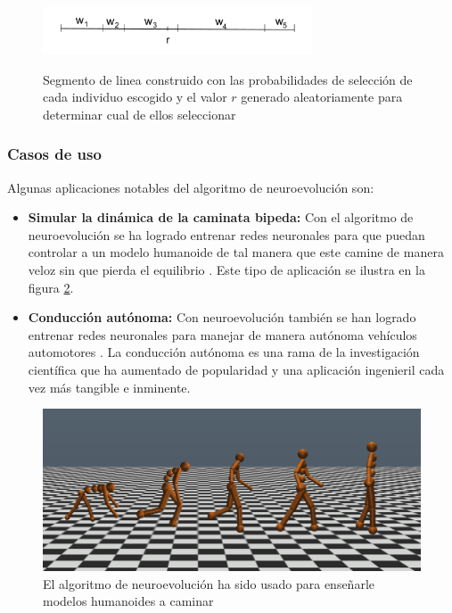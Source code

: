 \documentclass[twocolumn,spanish]{revtex4-1}
\begin{document}
\begin{figure}[ht]
\centering
\includegraphics[width=8cm]{ruleta.png}
\begin{quote}
\caption{Segmento de linea construido con las probabilidades de selección de cada individuo escogido y el valor $r$ generado aleatoriamente para determinar cual de ellos seleccionar \protect\cite{lipowski2012roulette}}
\label{fig:roulette}
\end{quote}
\end{figure}

\subsubsection{Casos de uso}
Algunas aplicaciones notables del algoritmo de neuroevolución son:

\begin{itemize}
    \item \textbf{Simular la dinámica de la caminata bipeda:} Con el algoritmo de neuroevolución se ha logrado entrenar redes neuronales para que puedan controlar a un modelo humanoide de tal manera que este camine de manera veloz sin que pierda el equilibrio \cite{jackson2019neuroevolution}. Este tipo de aplicación se ilustra en la figura \ref{fig:bipedo}.
    \item \textbf{Conducción autónoma:} Con neuroevolución también se han logrado entrenar redes neuronales para manejar de manera autónoma vehículos automotores \cite{sainathapplication}. La conducción autónoma es una rama de la investigación científica que ha aumentado de popularidad y una aplicación ingenieril cada vez más tangible e inminente.
\end{itemize}

\begin{figure}[h]
    \centering
    \includegraphics[width=0.9\linewidth]{images/neuroevol.png}
    \caption{El algoritmo de neuroevolución ha sido usado para enseñarle modelos humanoides a caminar \protect\cite{stanley2017welcoming}}
    \label{fig:bipedo}
\end{figure}
\end{document}
